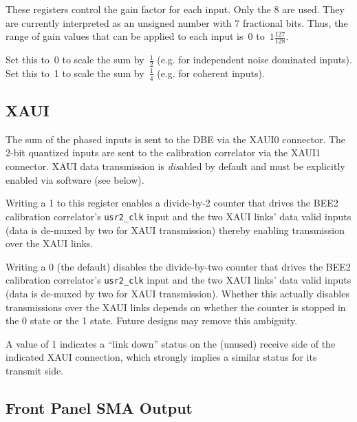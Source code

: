 \documentclass[12pt]{article}
\begin{document}
\begin{description}

 These registers control the gain factor for each input.  Only
the 8 \LSbs are used.  They are currently interpreted as an unsigned number
with 7 fractional bits.  Thus, the range of gain values that can be applied to
each input is~$0$ to~$1\frac{127}{128}$.

 Set this to~0 to scale the sum by~$\frac{1}{2}$ (e.g. for
independent noise dominated inputs).  Set this to~1 to scale the sum
by~$\frac{1}{4}$ (e.g. for coherent inputs).

\end{description}

  \subsection{XAUI}

The sum of the phased inputs is sent to the DBE via the XAUI0 connector.  The
2-bit quantized inputs are sent to the calibration correlator via the XAUI1
connector.  XAUI data transmission is \emph{dis}abled by default and must be
explicitly enabled via software (see below).

\begin{description}

 Writing a 1 to this register enables a divide-by-2 counter
that drives the BEE2 calibration correlator's \verb|usr2_clk| input and the two
XAUI links' data valid inputs (data is de-muxed by two for XAUI transmission)
thereby enabling transmission over the XAUI links.

Writing a 0 (the default) disables the divide-by-two counter that drives the
BEE2 calibration correlator's \verb|usr2_clk| input and the two XAUI links'
data valid inputs (data is de-muxed by two for XAUI transmission).  Whether
this actually disables transmissions over the XAUI links depends on whether the
counter is stopped in the 0 state or the 1 state.  Future designs may remove
this ambiguity.

 A value of 1 indicates a ``link down'' status on
the (unused) receive side of the indicated XAUI connection, which strongly
implies a similar status for its transmit side.

\end{description}

\filbreak
  \subsection{Front Panel SMA Output}
\end{document}
